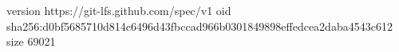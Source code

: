 version https://git-lfs.github.com/spec/v1
oid sha256:d0bf5685710d814c6496d43fbccad966b0301849898effedcea2daba4543c612
size 69021
